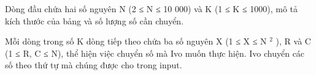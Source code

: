 Dòng đầu chứa hai số nguyên N (2 ≤ N ≤ 10 000) và K (1 ≤ K ≤ 1000), mô tả kích thước của bảng và số lượng số cần chuyển.

Mỗi dòng trong số K dòng tiếp theo chứa ba số nguyên X (1 ≤ X ≤ N $^ 2 $ ), R và C (1 ≤ R, C ≤ N), thể hiện việc chuyển số mà Ivo muốn thực hiện. Ivo chuyển các số theo thứ tự mà chúng được cho trong input.